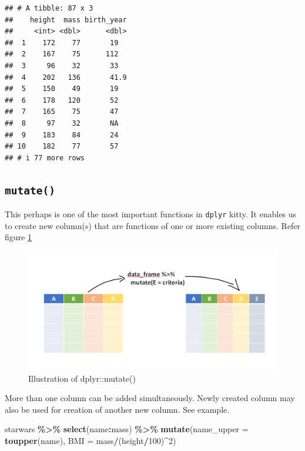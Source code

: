\documentclass[
]{book}
\newenvironment{Shaded}{\begin{snugshade}}{\end{snugshade}}
\newcommand{\AttributeTok}[1]{\textcolor[rgb]{0.13,0.29,0.53}{#1}}
\newcommand{\DecValTok}[1]{\textcolor[rgb]{0.00,0.00,0.81}{#1}}
\newcommand{\FunctionTok}[1]{\textcolor[rgb]{0.13,0.29,0.53}{\textbf{#1}}}
\newcommand{\NormalTok}[1]{#1}
\newcommand{\SpecialCharTok}[1]{\textcolor[rgb]{0.81,0.36,0.00}{\textbf{#1}}}
\begin{document}
\begin{verbatim}
## # A tibble: 87 x 3
##    height  mass birth_year
##     <int> <dbl>      <dbl>
##  1    172    77       19  
##  2    167    75      112  
##  3     96    32       33  
##  4    202   136       41.9
##  5    150    49       19  
##  6    178   120       52  
##  7    165    75       47  
##  8     97    32       NA  
##  9    183    84       24  
## 10    182    77       57  
## # i 77 more rows
\end{verbatim}

\hypertarget{mutate}{%
\subsection{\texorpdfstring{\texttt{mutate()}}{mutate()}}\label{mutate}}

This perhaps is one of the most important functions in \texttt{dplyr} kitty. It enables us to create new column(s) that are functions of one or more existing columns. Refer figure \ref{fig:mutater}

\begin{figure}

{\centering \includegraphics[width=0.99\linewidth]{images/mutate_dplyr} 

}

\caption{Illustration of dplyr::mutate()}\label{fig:mutater}
\end{figure}

More than one column can be added simultaneously. Newly created column may also be used for creation of another new column. See example.

\begin{Shaded}
\begin{Highlighting}[]
\NormalTok{starwars }\SpecialCharTok{\%\textgreater{}\%} 
  \FunctionTok{select}\NormalTok{(name}\SpecialCharTok{:}\NormalTok{mass) }\SpecialCharTok{\%\textgreater{}\%} 
  \FunctionTok{mutate}\NormalTok{(}\AttributeTok{name\_upper =} \FunctionTok{toupper}\NormalTok{(name),}
         \AttributeTok{BMI =}\NormalTok{ mass}\SpecialCharTok{/}\NormalTok{(height}\SpecialCharTok{/}\DecValTok{100}\NormalTok{)}\SpecialCharTok{\^{}}\DecValTok{2}\NormalTok{)}
\end{Highlighting}
\end{Shaded}
\end{document}
